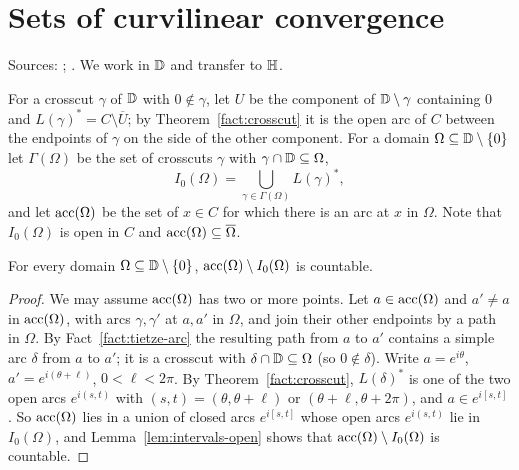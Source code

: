 \section{Sets of curvilinear convergence}\label{sec:cc}
Sources: \cite{MMJ}; \cite[\S4, Lemmas 7--8, Theorem 3]{Diss}. We work in $\mathbb{D}$ and transfer to $\mathbb{H}$.

\begin{definition}\label{def:acc}
For a crosscut $\gamma$ of $\mathbb{D}$ with $0\notin\gamma$, let $U$ be the component of $\mathbb{D}\setminus\gamma$ containing
$0$ and $L(\gamma)^*=C\setminus\overline U$; by Theorem~\ref{fact:crosscut} it is the open arc of $C$ between the
endpoints of $\gamma$ on the side of the other component. For a domain $\Omega\subseteq\mathbb{D}\setminus\{0\}$ let
$\Gamma(\Omega)$ be the set of crosscuts $\gamma$ with $\gamma\cap\mathbb{D}\subseteq\Omega$,
\[
I_0(\Omega)=\bigcup_{\gamma\in\Gamma(\Omega)}L(\gamma)^*,
\]
and let $\operatorname{acc}(\Omega)$ be the set of $x\in C$ for which there is an arc at $x$ in $\Omega$. Note that $I_0(\Omega)$ is
open in $C$ and $\operatorname{acc}(\Omega)\subseteq\overline\Omega$.
\end{definition}

\begin{lemma}\label{lem:mm-lemma2}
For every domain $\Omega\subseteq\mathbb{D}\setminus\{0\}$, $\operatorname{acc}(\Omega)\setminus I_0(\Omega)$ is countable.
\end{lemma}
\begin{proof}
We may assume $\operatorname{acc}(\Omega)$ has two or more points. Let $a\in\operatorname{acc}(\Omega)$ and $a'\ne a$ in $\operatorname{acc}(\Omega)$,
with arcs $\gamma,\gamma'$ at $a,a'$ in $\Omega$, and join their other endpoints by a path in $\Omega$. By
Fact~\ref{fact:tietze-arc} the resulting path from $a$ to $a'$ contains a simple arc $\delta$ from $a$ to $a'$;
it is a crosscut with $\delta\cap\mathbb{D}\subseteq\Omega$ (so $0\notin\delta$). Write $a=e^{i\theta}$,
$a'=e^{i(\theta+\ell)}$, $0<\ell<2\pi$. By Theorem~\ref{fact:crosscut}, $L(\delta)^*$ is one of the two open arcs
$e^{i(s,t)}$ with $(s,t)=(\theta,\theta+\ell)$ or $(\theta+\ell,\theta+2\pi)$, and $a\in e^{i[s,t]}$. So
$\operatorname{acc}(\Omega)$ lies in a union of closed arcs $e^{i[s,t]}$ whose open arcs $e^{i(s,t)}$ lie in $I_0(\Omega)$, and
Lemma~\ref{lem:intervals-open} shows that $\operatorname{acc}(\Omega)\setminus I_0(\Omega)$ is countable.
\end{proof}

